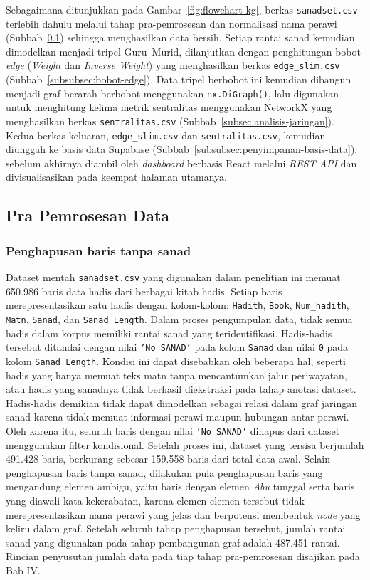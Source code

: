 Sebagaimana ditunjukkan pada Gambar~\ref{fig:flowchart-kg}, berkas \texttt{sanadset.csv} terlebih dahulu melalui tahap pra-pemrosesan dan normalisasi nama perawi (Subbab~\ref{subsec:pra-pemrosesan}) sehingga menghasilkan data bersih. Setiap rantai sanad kemudian dimodelkan menjadi tripel Guru--Murid, dilanjutkan dengan penghitungan bobot \textit{edge} (\textit{Weight} dan \textit{Inverse Weight}) yang menghasilkan berkas \texttt{edge\_slim.csv} (Subbab~\ref{subsubsec:bobot-edge}). Data tripel berbobot ini kemudian dibangun menjadi graf berarah berbobot menggunakan \texttt{nx.DiGraph()}, lalu digunakan untuk menghitung kelima metrik sentralitas menggunakan NetworkX yang menghasilkan berkas \texttt{sentralitas.csv} (Subbab~\ref{subsec:analisis-jaringan}). Kedua berkas keluaran, \texttt{edge\_slim.csv} dan \texttt{sentralitas.csv}, kemudian diunggah ke basis data Supabase (Subbab~\ref{subsubsec:penyimpanan-basis-data}), sebelum akhirnya diambil oleh \textit{dashboard} berbasis React melalui \textit{REST API} dan divisualisasikan pada keempat halaman utamanya.

\subsection{Pra Pemrosesan Data}
\label{subsec:pra-pemrosesan}
\subsubsection{Penghapusan baris tanpa sanad}
\begin{sloppypar}
Dataset mentah \texttt{sanadset.csv} yang digunakan dalam penelitian ini memuat 650.986 baris data hadis dari berbagai kitab hadis. Setiap baris merepresentasikan satu hadis dengan kolom-kolom: \texttt{Hadith}, \texttt{Book}, \texttt{Num\_hadith}, \texttt{Matn}, \texttt{Sanad}, dan \texttt{Sanad\_Length}.
Dalam proses pengumpulan data, tidak semua hadis dalam korpus memiliki rantai sanad yang teridentifikasi. Hadis-hadis tersebut ditandai dengan nilai \texttt{'No SANAD'} pada kolom \texttt{Sanad} dan nilai \texttt{0} pada kolom \texttt{Sanad\_Length}. Kondisi ini dapat disebabkan oleh beberapa hal, seperti hadis yang hanya memuat teks matn tanpa mencantumkan jalur periwayatan, atau hadis yang sanadnya tidak berhasil diekstraksi pada tahap anotasi dataset.
Hadis-hadis demikian tidak dapat dimodelkan sebagai relasi dalam graf jaringan sanad karena tidak memuat informasi perawi maupun hubungan antar-perawi. Oleh karena itu, seluruh baris dengan nilai \texttt{'No SANAD'} dihapus dari dataset menggunakan filter kondisional. Setelah proses ini, dataset yang tersisa berjumlah 491.428 baris, berkurang sebesar 159.558 baris dari total data awal. Selain penghapusan baris tanpa sanad, dilakukan pula penghapusan baris yang mengandung elemen ambigu, yaitu baris dengan elemen \textit{Abu} tunggal serta baris yang diawali kata kekerabatan, karena elemen-elemen tersebut tidak merepresentasikan nama perawi yang jelas dan berpotensi membentuk \textit{node} yang keliru dalam graf. Setelah seluruh tahap penghapusan tersebut, jumlah rantai sanad yang digunakan pada tahap pembangunan graf adalah 487.451 rantai. Rincian penyusutan jumlah data pada tiap tahap pra-pemrosesan disajikan pada Bab IV.
\end{sloppypar}

